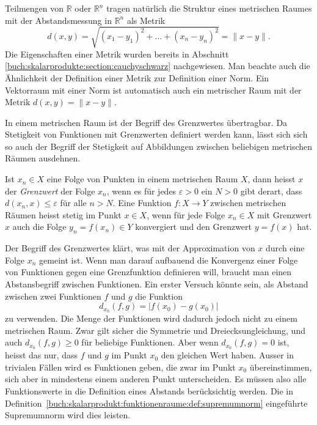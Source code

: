 Teilmengen von $\mathbb{R}$ oder $\mathbb{R}^n$ tragen natürlich
die Struktur eines metrischen Raumes mit der Abstandsmessung in 
$\mathbb{R}^n$ als Metrik
\[
d(x,y) = \!\sqrt{(x_1-y_1)^2 + \ldots + (x_n-y_n)^2} = \|x-y\|.
\]
Die Eigenschaften einer Metrik wurden bereits in Abschnitt
\ref{buch:skalarprodukte:section:cauchyschwarz} nachgewiesen.
Man beachte auch die Ähnlichkeit der Definition einer Metrik
zur Definition einer Norm.
Ein Vektorraum mit einer Norm ist automatisch auch ein
metrischer Raum mit der Metrik $d(x,y) = \|x-y\|$.

In einem metrischen Raum ist der Begriff des Grenzwertes übertragbar.
Da Stetigkeit von Funktionen mit Grenzwerten definiert werden kann,
lässt sich sich so auch der Begriff der Stetigkeit auf Abbildungen
zwischen beliebigen metrischen Räumen ausdehnen.

\begin{definition}[Grenzwert]
Ist $x_n\in X$ eine Folge von Punkten in einem metrischen Raum $X$,
dann heisst $x$ der {\em Grenzwert} der Folge $x_n$, wenn es für jedes
$\varepsilon>0$ ein $N>0$ gibt derart, dass
$d(x_n,x)\le \varepsilon$ für alle $n>N$.
Eine Funktion $f\colon X\to Y$ zwischen metrischen Räumen heisst
stetig im Punkt $x\in X$, wenn für jede Folge $x_n\in X$ mit
Grenzwert $x$ auch die Folge $y_n=f(x_n)\in Y$ konvergiert und
den Grenzwert $y=f(x)$ hat.
\end{definition}

Der Begriff des Grenzwertes klärt, was mit der Approximation von $x$
durch eine Folge $x_n$ gemeint ist.
Wenn man darauf aufbauend die Konvergenz einer Folge von Funktionen
gegen eine Grenzfunktion definieren will, braucht man einen Abstansbegriff
zwischen Funktionen.
Ein erster Versuch könnte sein, als Abstand zwischen zwei Funktionen
$f$ und $g$ die Funktion
\[
d_{x_0}(f,g) = |f(x_0) - g(x_0)|
\]
zu verwenden.
Die Menge der Funktionen wird dadurch jedoch nicht zu einem metrischen
Raum.
Zwar gilt sicher die Symmetrie und Dreiecksungleichung, und auch 
$d_{x_0}(f,g)\ge 0$ für beliebige Funktionen.
Aber wenn $d_{x_0}(f,g)=0$ ist, heisst das nur, dass $f$ und $g$ im Punkt
$x_0$ den gleichen Wert haben.
Ausser in trivialen Fällen wird es Funktionen geben, die zwar im Punkt
$x_0$ übereinstimmen, sich aber in mindestens einem anderen Punkt
unterscheiden.
Es müssen also alle Funktionswerte in die Definition eines Abstands
berücksichtig werden.
Die in Definition~\ref{buch:skalarprodukt:funktionenraume:def:supremumnorm}
eingeführte Supremumnorm wird dies leisten.

